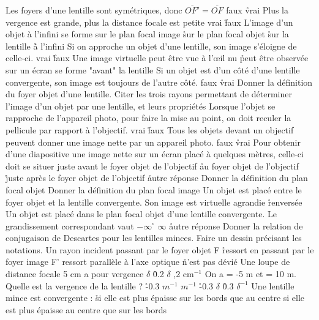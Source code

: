 \q
Les foyers d'une lentille sont symétriques, donc $\overline{OF'}=\overline{OF}$
\rv
faux
\r
vrai
\q
Plus la vergence est grande, plus la distance focale est petite
\rv
vrai
\r
faux
\q
L'image d'un objet à l'infini se forme
\rv
sur le plan focal image
\r
sur le plan focal objet
\r
sur la lentille
\r
à l'infini
\q
Si on approche un objet d'une lentille, son image s'éloigne de celle-ci.
\rv
vrai
\r
faux
\q
Une image virtuelle
\rv
peut être vue à l'\oe il nu
\r
peut être observée sur un écran
\rv
se forme "avant" la lentille
\q
Si un objet est d'un côté d'une lentille convergente, son image est toujours de l'autre côté.
\rv
faux
\r
vrai
\q
Donner la définition du foyer objet d'une lentille.
Citer les trois rayons permettant de déterminer l'image d'un objet par une lentille, et leurs propriétés
\q
Lorsque l'objet se rapproche de l'appareil photo, pour faire la mise au point, on doit reculer la pellicule par rapport à l'objectif.
\rv
vrai
\r
faux
\q
Tous les objets devant un objectif peuvent donner une image nette par un appareil photo.
\rv
faux
\r
vrai
\q
Pour obtenir d'une diapositive une image nette sur un écran placé à quelques mètres, celle-ci doit se situer
\rv
juste avant le foyer objet de l'objectif
\r
au foyer objet de l'objectif
\r
juste après le foyer objet de l'objectif
\r
autre réponse
\q
Donner la définition du plan focal objet
\q
Donner la définition du plan focal image
\q
Un objet est placé entre le foyer objet et la lentille convergente. Son image est 
\rv
virtuelle
\rv
agrandie
\r
renversée
\q
Un objet est placé dans le plan focal objet d'une lentille convergente. Le grandissement correspondant vaut
\rv
$-\infty$
\r
$\infty$
\r
autre réponse
\q
Donner la relation de conjugaison de Descartes pour les lentilles minces. Faire un dessin précisant les notations.
\q
Un rayon incident passant par le foyer objet F
\r
ressort en passant par le foyer image F'
\rv
ressort parallèle à l'axe optique
\r
n'est pas dévié
\q
Une loupe de distance focale 5 cm a pour vergence 
 $\delta$
\r
0.2 $\delta$
,2 cm$^{-1}$
\q
On a  = -5 m et  = 10 m. Quelle est la vergence de la lentille
?
\r
-0.3 $m^{-1}$
 $m^{-1}$
\r
-0.3 $\delta$
\r
0.3 $\delta^{-1}$
\q 
Une lentille mince est convergente :
\r 
si elle est plus épaisse sur les bords que au centre
\rv
si elle est plus épaisse au centre que sur les bords


